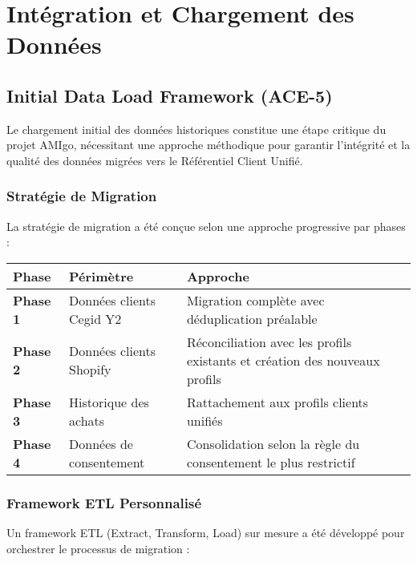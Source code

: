 
\chapter{Intégration et Chargement des Données}

\section{Initial Data Load Framework (ACE-5)}

\begin{mdframed}[backgroundcolor=lightgreen!20, linewidth=1pt]
Le chargement initial des données historiques constitue une étape critique du projet AMIgo, nécessitant une approche méthodique pour garantir l'intégrité et la qualité des données migrées vers le Référentiel Client Unifié.
\end{mdframed}

\subsection{Stratégie de Migration}

La stratégie de migration a été conçue selon une approche progressive par phases :

\begin{center}
\begin{tabular}{|>{\bfseries}p{3cm}|p{5cm}|p{5.5cm}|}
\hline
\rowcolor{lightblue} Phase & Périmètre & Approche \\
\hline
Phase 1 & Données clients Cegid Y2 & Migration complète avec déduplication préalable \\
\hline
Phase 2 & Données clients Shopify & Réconciliation avec les profils existants et création des nouveaux profils \\
\hline
Phase 3 & Historique des achats & Rattachement aux profils clients unifiés \\
\hline
Phase 4 & Données de consentement & Consolidation selon la règle du consentement le plus restrictif \\
\hline
\end{tabular}
\end{center}

\subsection{Framework ETL Personnalisé}

Un framework ETL (Extract, Transform, Load) sur mesure a été développé pour orchestrer le processus de migration :

